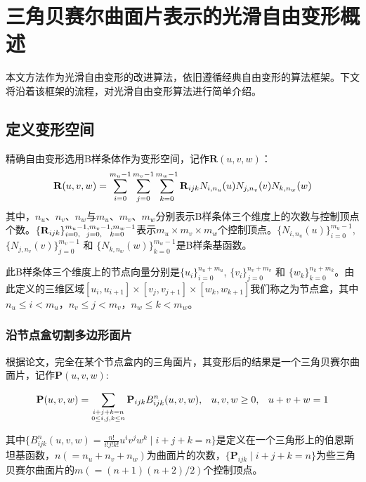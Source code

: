 
\chapter{三角贝赛尔曲面片表示的光滑自由变形概述}
本文方法作为光滑自由变形\cite{Cui15}的改进算法，依旧遵循经典自由变形的算法框架。下文将沿着该框架的流程，对光滑自由变形算法进行简单介绍。

\section{定义变形空间}
精确自由变形选用B样条体作为变形空间，记作$\mathbf R(u,v,w)$：
\begin{equation}
	\footnotesize
	{\mathbf R}(u,v,w) 
	= \sum_{i=0}^{m_u-1}\sum_{j=0}^{m_v-1}\sum_{k=0}^{m_w-1} {\mathbf
	R}_{ijk}N_{i,n_u}(u)N_{j,n_v}(v)N_{k,n_w}(w)
	\label{equ:Ruvw}
\end{equation}
其中，$n_u$、$n_v$、$n_w$与$m_u$、$m_v$、$m_w$分别表示B样条体三个维度上的次数与控制顶点个数。$\{\mathbf R_{ijk}\}_{i=0,\hspace{6 pt} j=0,\hspace{8 pt} k=0}^{m_u-1,m_v-1,m_w-1}$表示$m_u\times m_v\times m_w$个控制顶点。$\{N_{i,n_u}(u)\}_{i=0}^{m_u-1}$, $\{N_{j,n_v}(v)\}_{j=0}^{m_v-1}$ 和 $\{N_{k,n_w}(w)\}_{k=0}^{m_w-1}$是B样条基函数。

此B样条体三个维度上的节点向量分别是$\{u_i\}^{n_u+m_u}_{i=0}$, $\{v_i\}^{n_v+m_v}_{j=0}$ 和 $\{w_k\}^{n_k+m_k}_{k=0}$。由此定义的三维区域$[u_i, u_{i+1}] \times [v_j, v_{j+1}] \times [w_k, w_{k+1}]$我们称之为节点盒，其中$n_u\leq i < m_u$，$n_v\leq j < m_v$，$n_w\leq k < m_w$。

\subsection{沿节点盒切割多边形面片}
根据论文\cite{Feng98, Feng00}，完全在某个节点盒内的三角面片，其变形后的结果是一个三角贝赛尔曲面片，记作${\mathbf P}(u,v,w)$:\label{section:split}

\begin{equation}
	\footnotesize
	{\mathbf P}(u,v,w)
	= \sum_{\substack{i+j+k=n \\ 0\leq i,j,k\leq n}} {\mathbf P}_{ijk}B^n_{ijk}(u,v,w), \hspace{8 pt} u,v,w\ge0,
		\hspace{8 pt}u+v+w=1
	\label{equ:Puvw}
\end{equation}

其中$\{B_{ijk}^n(u,v,w)=\frac{n!}{i!j!k!}u^iv^jw^k \mid i+j+k=n\}$是定义在一个三角形上的伯恩斯坦基函数，$n(=n_u+n_v+n_w)$为曲面片的次数，$\{\mathbf P_{ijk} \mid i+j+k=n\}$为些三角贝赛尔曲面片的$m(=(n+1)(n+2)/2)$个控制顶点。

